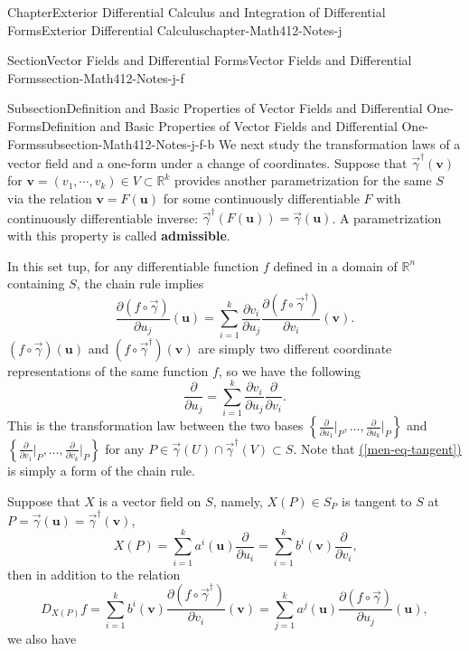 \documentclass[oneside,10pt,]{book}
\newcommand{\xreffont}{\relax}
\newcommand{\terminology}[1]{\textbf{#1}}
\numberwithin{equation}{section}
\newcommand{\bu}{\mathbf{u}}
\newcommand{\bv}{\mathbf{v}}
\newcommand{\bbR}{\mathbb{R}}
\newcommand{\vg}{{\vec{\gamma}}}
\begin{document}
\begin{chapterptx}{Chapter}{Exterior Differential Calculus and Integration of Differential Forms}{}{Exterior Differential Calculus}{}{}{chapter-Math412-Notes-j}
\begin{sectionptx}{Section}{Vector Fields and Differential Forms}{}{Vector Fields and Differential Forms}{}{}{section-Math412-Notes-j-f}
\begin{subsectionptx}{Subsection}{Definition and Basic Properties of Vector Fields and Differential One-Forms}{}{Definition and Basic Properties of Vector Fields and Differential One-Forms}{}{}{subsection-Math412-Notes-j-f-b}
We next study  the transformation laws of a  vector field and a one-form under a change of coordinates.  Suppose that  \(\vg^{\dagger}(\bv)\) for \(\bv=( v_{1}, \cdots, v_{k})\in V\subset \bbR^{k}\) provides another parametrization for the same \(S\) via the relation \(\bv=F(\bu)\) for some continuously differentiable \(F\) with continuously differentiable inverse: \(\vg^{\dagger}(F(\bu))= \vg(\bu)\). A parametrization with this property is called \terminology{admissible}.%
\par
In this set tup,  for any differentiable function \(f\) defined in a domain of \(\bbR^{n}\) containing \(S\), the chain rule implies%
\begin{equation*}
\frac{\partial (f\circ \vg)}{\partial u_{j}}(\bu)
=\sum_{i=1}^{k} \frac{\partial v_{i}}{\partial u_{j}}
\frac{\partial (f\circ \vg^{\dagger})}{\partial v_{i}}(\bv)\text{.}
\end{equation*}
\((f\circ \vg)(\bu)\) and \((f\circ \vg^{\dagger})(\bv)\) are simply two different coordinate representations of the same function \(f\), so we have the following%
\begin{equation}
\frac{\partial }{\partial u_{j}}=\sum_{i=1}^{k} \frac{\partial v_{i}}{\partial u_{j}}
\frac{\partial }{\partial v_{i}}.\label{men-eq-tangent}
\end{equation}
This is the transformation law between the two bases \(\left\{  \frac{\partial }{\partial u_{1}}\Big|_P, \ldots,  \frac{\partial }{\partial u_{k}}\Big|_P\right\}\) and \(\left\{  \frac{\partial }{\partial v_{1}}\Big|_P, \ldots,  \frac{\partial }{\partial v_{k}}\Big|_P\right\}\) for any \(P\in \vg (U)\cap \vg^{\dagger}(V)\subset S\). Note that \hyperref[men-eq-tangent]{({\xreffont\ref{men-eq-tangent}})} is simply a form of the chain rule.%
\par
Suppose that \(X\) is a  vector field on \(S\), namely, \(X(P) \in S_{P}\) is tangent to \(S\) at \(P=\vg(\bu)=\vg^{\dagger}(\bv)\),%
\begin{equation}
X(P)=\sum_{i=1}^{k}a^{i}(\bu)\frac{\partial }{\partial u_{i}}
=\sum_{i=1}^{k}b^{i}(\bv)\frac{\partial }{\partial v_{i}}\text{,}\label{men-eq-tangent0}
\end{equation}
then in addition to the relation%
\begin{equation*}
D_{X(P)} f= \sum_{i=1}^{k}b^{i}(\bv)\frac{\partial (f\circ \vg^{\dagger})}{\partial v_{i}}(\bv)
=\sum_{j=1}^{k}a^{j}(\bu)\frac{\partial ( f\circ \vg) }{\partial u_{j}}(\bu),
\end{equation*}
we also have %
\begin{equation}

\end{equation}
\end{subsectionptx}
\end{sectionptx}
\end{chapterptx}
\end{document}
